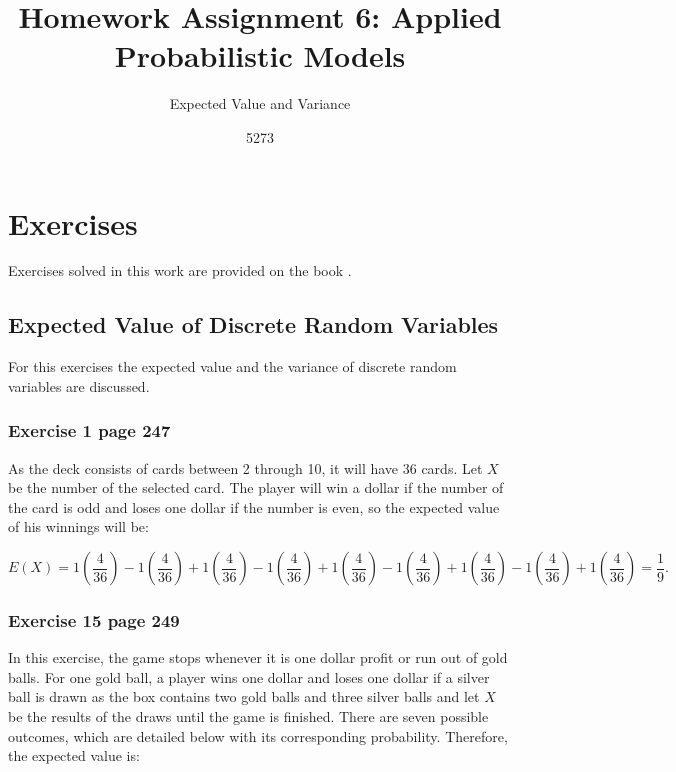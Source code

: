 \documentclass[10pt,leter,openany]{article}
\author{5273}
\title{Homework Assignment 6: Applied Probabilistic Models}
\subtitle{Expected Value and Variance}
\date{}
\begin{document}
	
\maketitle

\section{Exercises}
	
	Exercises solved in this work are provided on the book \citet{grinstead2012introduction}. 
	
	\subsection{Expected Value of Discrete Random Variables}
	
	For this exercises the expected value and the variance of discrete random variables are discussed.
	
	\subsubsection*{Exercise 1 page 247}
	
	As the deck consists of cards between 2 through 10, it will have 36 cards. Let $ X  $be the number of the selected card. The player will win a dollar if the number of the card is odd and loses one dollar if the number is even, so the expected value of his winnings will be:
	
	\begin{equation*}
		E(X) = 1\left( \dfrac{4}{36}\right)  - 1\left( \dfrac{4}{36}\right)  + 1\left( \dfrac{4}{36}\right) - 1\left( \dfrac{4}{36}\right) + 1\left( \dfrac{4}{36}\right) - 1\left( \dfrac{4}{36}\right) + 1\left( \dfrac{4}{36}\right) - 1\left( \dfrac{4}{36}\right) + 1\left( \dfrac{4}{36}\right) = \dfrac{1}{9}.
	\end{equation*}
	
	\subsubsection*{Exercise 15 page 249}
	
	In this exercise, the game stops whenever it is one dollar profit or run out of gold balls.  For one gold ball, a player wins one dollar and loses one dollar if a silver ball is drawn as the box contains two gold balls and three silver balls and let $ X $ be the results of the draws until the game is finished. There are seven possible outcomes, which are detailed below with its corresponding probability. Therefore, the expected value is:
	
\end{document}
